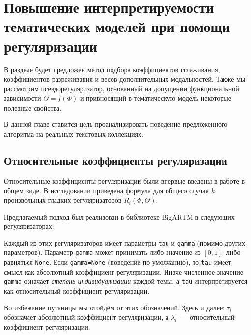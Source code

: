 \chapter{Повышение интерпретируемости тематических моделей при помощи регуляризации}

В разделе будет предложен метод подбора коэффициентов сглаживания, коэффициентов разреживания и весов дополнительных модальностей. Также мы рассмотрим псевдорегуляризатор, основанный на допущении функциональной зависимости $\Theta = f(\Phi)$ и привносящий в тематическую модель некоторые полезные свойства.

В данной главе ставится цель проанализировать поведение предложенного алгоритма на реальных текстовых коллекциях.

\section{Относительные коэффициенты регуляризации} \label{sec:relative}



Относительные коэффициенты регуляризации были впервые введены в работе \cite{doykov} в общем виде.  В исследовании \cite{doykov} приведена формула для общего случая $k$ произвольных гладких регуляризаторов $R_i(\Phi, \Theta)$.

Предлагаемый подход был реализован в библиотеке BigARTM в следующих регуляризаторах: 

Каждый из этих регуляризаторов имеет параметры \texttt{tau} и \texttt{gamma} (помимо других параметров). Параметр \texttt{gamma} может принимать либо значение из $[0, 1]$, либо равняться \texttt{None}. Если \texttt{gamma=None} (поведение по умолчанию), то \texttt{tau} имеет смысл как абсолютный коэффициент регуляризации. Иначе численное значение \texttt{gamma} означает \textit{степень индивидуализации} каждой темы, а \texttt{tau} интерпретируется как относительный коэффициент регуляризации.

Во избежание путаницы мы отойдём от этих обозначений. Здесь и далее: $\tau_i$ обозначает абсолютный коэффициент регуляризации, а $\lambda_i$~--- относительный коэффициент регуляризации.

